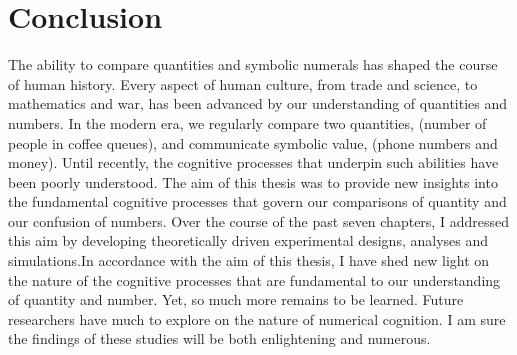 \section{Conclusion}
The ability to compare quantities and symbolic numerals has shaped the course of human history. Every aspect of human culture, from trade and science, to mathematics and war, has been advanced by our understanding of quantities and numbers. In the modern era, we regularly compare two quantities, (\eg number of people in coffee queues), and communicate symbolic value, (\eg phone numbers and money). Until recently, the cognitive processes that underpin such abilities have been poorly understood. The aim of this thesis was to provide new insights into the fundamental cognitive processes that govern our comparisons of quantity and our confusion of numbers. Over the course of the past seven chapters, I addressed this aim by developing theoretically driven experimental designs, analyses and simulations.In accordance with the aim of this thesis, I have shed new light on the nature of the cognitive processes that are fundamental to our understanding of quantity and number. Yet, so much more remains to be learned. Future researchers have much to explore on the nature of numerical cognition. I am sure the findings of these studies will be both enlightening and numerous.

